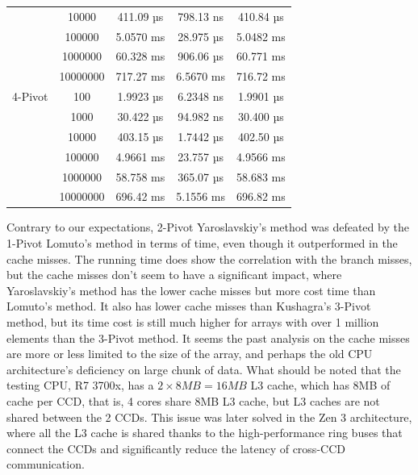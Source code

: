 \documentclass{article}
\newcommand{\bigO}{\mathcal{O}}
\begin{document}
\begin{center}
\begin{tabular}{ |c c | c c c| }
                        & 10000    & 411.09 µs    & 798.13 ns   & 410.84 µs \\
                        & 100000   & 5.0570 ms    & 28.975 µs   & 5.0482 ms \\
                        & 1000000  & 60.328 ms    & 906.06 µs   & 60.771 ms \\
                        & 10000000 & 717.27 ms    & 6.5670 ms   & 716.72 ms \\
        \hline
        4-Pivot         & 100      & 1.9923 µs    &	6.2348 ns   & 1.9901 µs \\
                        & 1000     & 30.422 µs    &	94.982 ns   & 30.400 µs \\
                        & 10000    & 403.15 µs    & 1.7442 µs   & 402.50 µs \\
                        & 100000   & 4.9661 ms    & 23.757 µs   & 4.9566 ms \\
                        & 1000000  & 58.758 ms    & 365.07 µs 	& 58.683 ms \\
                        & 10000000 & 696.42 ms    & 5.1556 ms   & 696.82 ms \\
        \hline
    \end{tabular}
\end{center}


Contrary to our expectations, 2-Pivot Yaroslavskiy's method was defeated by the 1-Pivot Lomuto's method in terms of time, even though it outperformed in the cache misses.
The running time does show the correlation with the branch misses, but the cache misses don't seem to have a significant impact, where Yaroslavskiy's method has the lower cache misses but more cost time than Lomuto's method.
It also has lower cache misses than Kushagra's 3-Pivot method, but its time cost is still much higher for arrays with over 1 million elements than the 3-Pivot method.
It seems the past analysis on the cache misses are more or less limited to the size of the array, and perhaps the old CPU architecture's deficiency on large chunk of data.
What should be noted that the testing CPU, R7 3700x, has a $2 \times 8MB = 16MB$ L3 cache, which has 8MB of cache per CCD, that is, 4 cores share 8MB L3 cache, but L3 caches are not shared between the 2 CCDs.
This issue was later solved in the Zen 3 architecture, where all the L3 cache is shared thanks to the high-performance ring buses that connect the CCDs and significantly reduce the latency of cross-CCD communication.
\end{document}
